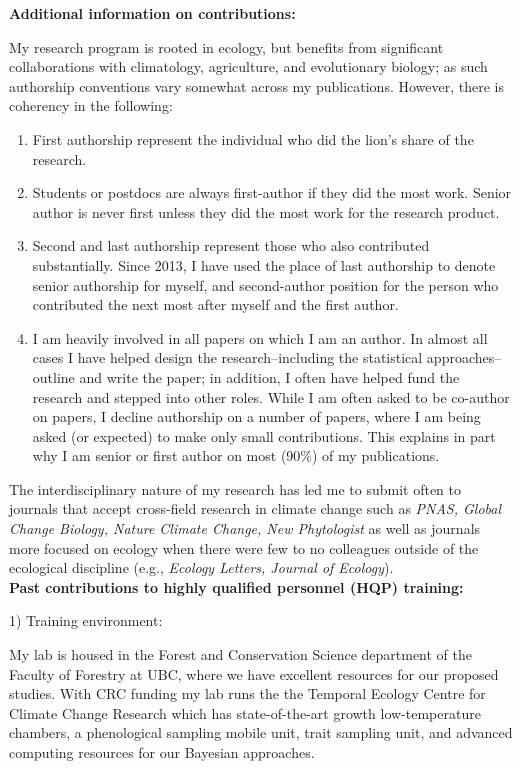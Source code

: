 \documentclass[12pt,oneside]{article}
\begin{document}
{\bf Additional information on contributions:}

My research program is rooted in ecology, but benefits from significant collaborations with climatology, agriculture, and evolutionary biology; as such authorship conventions vary somewhat across my publications. However, there is coherency in the following:

\begin{enumerate}
\item First authorship represent the individual who did the lion's share of the research.
\item Students or postdocs are always first-author if they did the most work. Senior author is never first unless they did the most work for the research product.
\item Second and last authorship represent those who also contributed substantially. Since 2013, I have used the place of last authorship to denote senior authorship for myself, and second-author position for the person who contributed the next most after myself and the first author. 
\item I am heavily involved in all papers on which I am an author. In almost all cases I have helped design the research--including the statistical approaches--outline and write the paper; in addition, I often have helped fund the research and stepped into other roles. While I am often asked to be co-author on papers, I decline authorship on a number of papers, where I am being asked (or expected) to make only small contributions. This explains in part why I am senior or first author on most (90\%) of my publications. 
\end{enumerate}


The interdisciplinary nature of my research has led me to submit often to journals that accept cross-field research in climate change such as \emph{PNAS, Global Change Biology, Nature Climate Change, New Phytologist} as well as journals more focused on ecology when there were few to no colleagues outside of the ecological discipline (e.g., \emph{Ecology Letters, Journal of Ecology}).\\

{\bf Past contributions to highly qualified personnel (HQP) training:}

1) Training environment:

My lab is housed in the Forest and Conservation Science department of the Faculty of Forestry at UBC, where we have excellent resources for our proposed studies. With CRC funding my lab runs the the Temporal Ecology Centre for Climate Change Research which has state-of-the-art growth low-temperature chambers, a phenological sampling mobile unit, trait sampling unit, and advanced computing resources for our Bayesian approaches.
\end{document}
